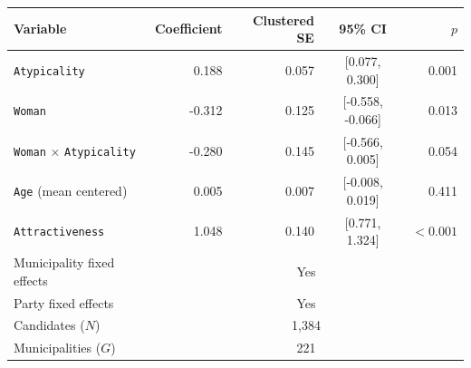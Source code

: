 \begin{tabular}{@{}lrrcr@{}}
\toprule
Variable & Coefficient & Clustered SE & 95\% CI & $p$ \\
\midrule
\texttt{Atypicality} & 0.188 & 0.057 & [0.077, 0.300] & 0.001 \\
\texttt{Woman} & -0.312 & 0.125 & [-0.558, -0.066] & 0.013 \\
\texttt{Woman} $\times$ \texttt{Atypicality} & -0.280 & 0.145 & [-0.566, 0.005] & 0.054 \\
\texttt{Age} (mean centered) & 0.005 & 0.007 & [-0.008, 0.019] & 0.411 \\
\texttt{Attractiveness} & 1.048 & 0.140 & [0.771, 1.324] & $<0.001$ \\
\midrule
Municipality fixed effects & \multicolumn{4}{c}{Yes} \\
Party fixed effects & \multicolumn{4}{c}{Yes} \\
Candidates ($N$) & \multicolumn{4}{c}{1,384} \\
Municipalities ($G$) & \multicolumn{4}{c}{221} \\
\bottomrule
\end{tabular}
